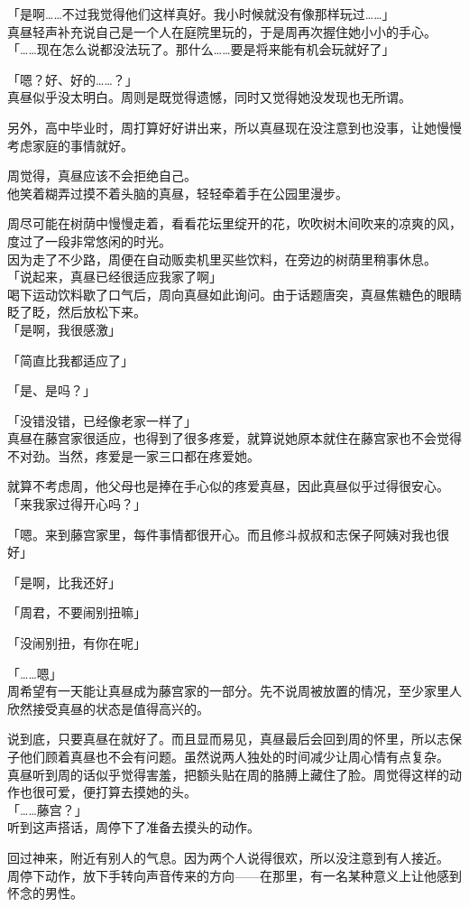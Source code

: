 「是啊……不过我觉得他们这样真好。我小时候就没有像那样玩过……」\\

真昼轻声补充说自己是一个人在庭院里玩的，于是周再次握住她小小的手心。\\

「……现在怎么说都没法玩了。那什么……要是将来能有机会玩就好了」

「嗯？好、好的……？」\\

真昼似乎没太明白。周则是既觉得遗憾，同时又觉得她没发现也无所谓。

另外，高中毕业时，周打算好好讲出来，所以真昼现在没注意到也没事，让她慢慢考虑家庭的事情就好。

周觉得，真昼应该不会拒绝自己。\\

他笑着糊弄过摸不着头脑的真昼，轻轻牵着手在公园里漫步。

周尽可能在树荫中慢慢走着，看看花坛里绽开的花，吹吹树木间吹来的凉爽的风，度过了一段非常悠闲的时光。\\

因为走了不少路，周便在自动贩卖机里买些饮料，在旁边的树荫里稍事休息。\\

「说起来，真昼已经很适应我家了啊」\\

喝下运动饮料歇了口气后，周向真昼如此询问。由于话题唐突，真昼焦糖色的眼睛眨了眨，然后放松下来。\\

「是啊，我很感激」

「简直比我都适应了」

「是、是吗？」

「没错没错，已经像老家一样了」\\

真昼在藤宫家很适应，也得到了很多疼爱，就算说她原本就住在藤宫家也不会觉得不对劲。当然，疼爱是一家三口都在疼爱她。

就算不考虑周，他父母也是捧在手心似的疼爱真昼，因此真昼似乎过得很安心。\\

「来我家过得开心吗？」

「嗯。来到藤宫家里，每件事情都很开心。而且修斗叔叔和志保子阿姨对我也很好」

「是啊，比我还好」

「周君，不要闹别扭嘛」

「没闹别扭，有你在呢」

「……嗯」\\

周希望有一天能让真昼成为藤宫家的一部分。先不说周被放置的情况，至少家里人欣然接受真昼的状态是值得高兴的。

说到底，只要真昼在就好了。而且显而易见，真昼最后会回到周的怀里，所以志保子他们顾着真昼也不会有问题。虽然说两人独处的时间减少让周心情有点复杂。\\

真昼听到周的话似乎觉得害羞，把额头贴在周的胳膊上藏住了脸。周觉得这样的动作也很可爱，便打算去摸她的头。\\

「……藤宫？」\\

听到这声搭话，周停下了准备去摸头的动作。

回过神来，附近有别人的气息。因为两个人说得很欢，所以没注意到有人接近。\\

周停下动作，放下手转向声音传来的方向——在那里，有一名某种意义上让他感到怀念的男性。
